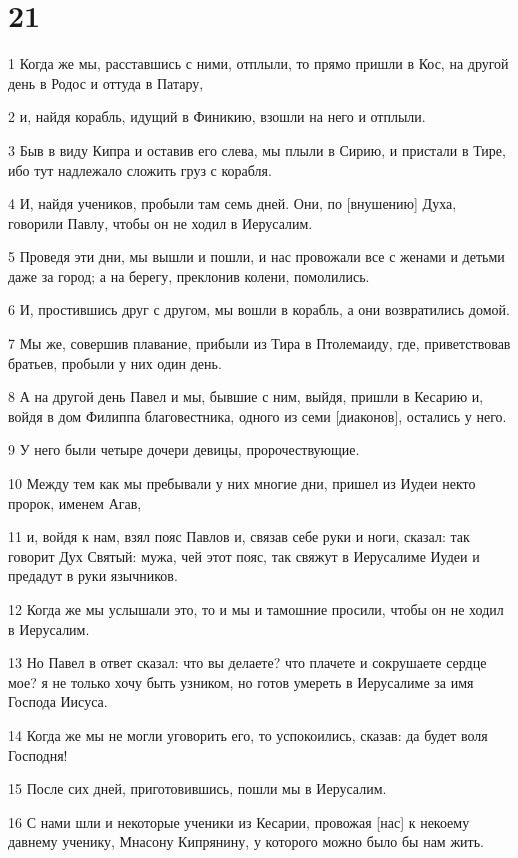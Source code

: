 \chapter{21}

\par 1 Когда же мы, расставшись с ними, отплыли, то прямо пришли в Кос, на другой день в Родос и оттуда в Патару,
\par 2 и, найдя корабль, идущий в Финикию, взошли на него и отплыли.
\par 3 Быв в виду Кипра и оставив его слева, мы плыли в Сирию, и пристали в Тире, ибо тут надлежало сложить груз с корабля.
\par 4 И, найдя учеников, пробыли там семь дней. Они, по [внушению] Духа, говорили Павлу, чтобы он не ходил в Иерусалим.
\par 5 Проведя эти дни, мы вышли и пошли, и нас провожали все с женами и детьми даже за город; а на берегу, преклонив колени, помолились.
\par 6 И, простившись друг с другом, мы вошли в корабль, а они возвратились домой.
\par 7 Мы же, совершив плавание, прибыли из Тира в Птолемаиду, где, приветствовав братьев, пробыли у них один день.
\par 8 А на другой день Павел и мы, бывшие с ним, выйдя, пришли в Кесарию и, войдя в дом Филиппа благовестника, одного из семи [диаконов], остались у него.
\par 9 У него были четыре дочери девицы, пророчествующие.
\par 10 Между тем как мы пребывали у них многие дни, пришел из Иудеи некто пророк, именем Агав,
\par 11 и, войдя к нам, взял пояс Павлов и, связав себе руки и ноги, сказал: так говорит Дух Святый: мужа, чей этот пояс, так свяжут в Иерусалиме Иудеи и предадут в руки язычников.
\par 12 Когда же мы услышали это, то и мы и тамошние просили, чтобы он не ходил в Иерусалим.
\par 13 Но Павел в ответ сказал: что вы делаете? что плачете и сокрушаете сердце мое? я не только хочу быть узником, но готов умереть в Иерусалиме за имя Господа Иисуса.
\par 14 Когда же мы не могли уговорить его, то успокоились, сказав: да будет воля Господня!
\par 15 После сих дней, приготовившись, пошли мы в Иерусалим.
\par 16 С нами шли и некоторые ученики из Кесарии, провожая [нас] к некоему давнему ученику, Мнасону Кипрянину, у которого можно было бы нам жить.
